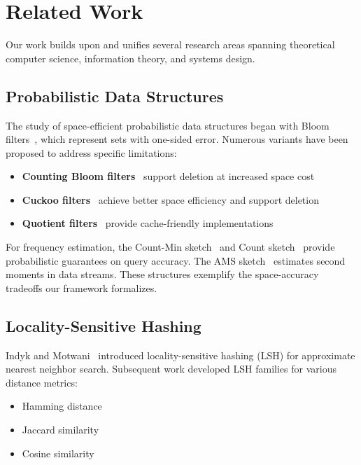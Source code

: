 \providecommand{\mainx}{..}
\section{Related Work}
\label{sec:related}

Our work builds upon and unifies several research areas spanning theoretical computer science, information theory, and systems design.

\subsection{Probabilistic Data Structures}

The study of space-efficient probabilistic data structures began with Bloom filters~\cite{bloom1970}, which represent sets with one-sided error.
Numerous variants have been proposed to address specific limitations:
\begin{itemize}
    \item \textbf{Counting Bloom filters}~\cite{fan2000} support deletion at increased space cost
    \item \textbf{Cuckoo filters}~\cite{fan2014} achieve better space efficiency and support deletion
    \item \textbf{Quotient filters}~\cite{bender2012} provide cache-friendly implementations
\end{itemize}

For frequency estimation, the Count-Min sketch~\cite{cormode2005} and Count sketch~\cite{charikar2002} provide probabilistic guarantees on query accuracy.
The AMS sketch~\cite{alon1996} estimates second moments in data streams.
These structures exemplify the space-accuracy tradeoffs our framework formalizes.

\subsection{Locality-Sensitive Hashing}

Indyk and Motwani~\cite{indyk1998} introduced locality-sensitive hashing (LSH) for approximate nearest neighbor search.
Subsequent work developed LSH families for various distance metrics:
\begin{itemize}
    \item Hamming distance~\cite{gionis1999}
    \item Jaccard similarity~\cite{broder1997}
    \item Cosine similarity~\cite{charikar2002similarity}
\end{itemize}

